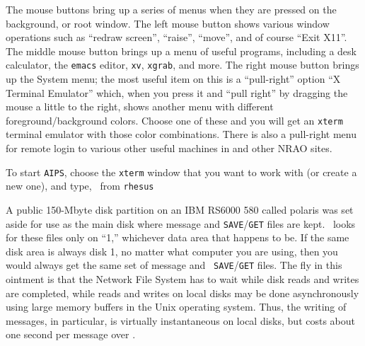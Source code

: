 The mouse buttons bring up a series of menus when they are pressed on
the background, or root window.  The left mouse button shows various
window operations such as ``redraw screen'', ``raise'', ``move'', and
of course ``Exit X11''.  The middle mouse button brings up a menu of
useful programs, including a desk calculator, the {\tt emacs} editor,
{\tt xv}, {\tt xgrab}, and more.  The right mouse button brings up the
System menu; the most useful item on this is a ``pull-right'' option
``X Terminal Emulator'' which, when you press it and ``pull right'' by
dragging the mouse a little to the right, shows another menu with
different foreground/background colors.  Choose one of these and you
will get an {\tt xterm} terminal emulator with those color
combinations.  There is also a pull-right menu for remote login to
various other useful machines in  and other NRAO
sites.

     To start {\tt AIPS}, choose the {\tt xterm} window that you want
to work with (or create a new one), and type, \eg\ from {\tt rhesus}


     A public 150-Mbyte disk partition on an IBM RS6000 580 called
polaris was set aside for use as the main disk where message and
{\tt SAVE}/{\tt GET} files are kept.  \AIPS\ looks for these files
only on  ``1,'' whichever data area that happens to be.  If
the same disk area is always disk 1, no matter what computer you are
using, then you would always get the same set of message and {\tt
SAVE}/{\tt GET} files.  The fly in this ointment is that the Network
File System has to wait while disk reads and writes are completed,
while reads and writes on local disks may be done asynchronously using
large memory buffers in the Unix operating system.  Thus, the writing
of messages, in particular, is virtually instantaneous on local disks,
but costs about one second per message over \hbox{}.

